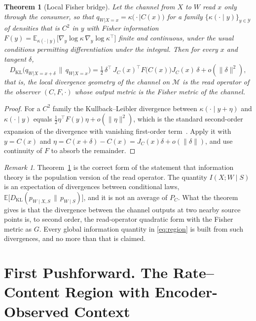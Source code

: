 \documentclass[11pt]{article}
\newtheorem{theorem}{Theorem}
\theoremstyle{definition}
\theoremstyle{remark}
\newtheorem*{remark}{Remark}
\newcommand{\PC}{P_{C}}
\newcommand{\M}{\mathcal{M}}
\newcommand{\Y}{\mathcal{Y}}
\newcommand{\E}{\mathbb{E}}
\begin{document}
\begin{theorem}[Local Fisher bridge]
\label{thm:fisher}
Let the channel from $X$ to $W$ read $x$ only through the consumer, so that $q_{W|X=x}=\kappa\bigl(\cdot\mid C(x)\bigr)$ for a family $\{\kappa(\cdot\mid y)\}_{y\in\Y}$ of densities that is $C^{2}$ in $y$ with Fisher information $F(y)=\E_{\kappa(\cdot\mid y)}\bigl[\nabla_{y}\log\kappa\,\nabla_{y}\log\kappa^{\top}\bigr]$ finite and continuous, under the usual conditions permitting differentiation under the integral. Then for every $x$ and tangent $\delta$,
\begin{equation}
D_{\mathrm{KL}}\bigl(q_{W|X=x+\delta}\,\big\|\,q_{W|X=x}\bigr)=\tfrac12\,\delta^{\top}\,J_{C}(x)^{\top}F\bigl(C(x)\bigr)J_{C}(x)\,\delta+o(\|\delta\|^{2}),
\label{eq:fisher}
\end{equation}
that is, the local divergence geometry of the channel on $\M$ is the read operator of the observer $(C,F,\cdot)$ whose output metric is the Fisher metric of the channel.
\end{theorem}

\begin{proof}
For a $C^{2}$ family the Kullback--Leibler divergence between $\kappa(\cdot\mid y+\eta)$ and $\kappa(\cdot\mid y)$ equals $\tfrac12\eta^{\top}F(y)\eta+o(\|\eta\|^{2})$, which is the standard second-order expansion of the divergence with vanishing first-order term~\cite{amari2016}.
Apply it with $y=C(x)$ and $\eta=C(x+\delta)-C(x)=J_{C}(x)\delta+o(\|\delta\|)$, and use continuity of $F$ to absorb the remainder.
\end{proof}

\begin{remark}
Theorem~\ref{thm:fisher} is the correct form of the statement that information theory is the population version of the read operator.
The quantity $I(X;W\mid S)$ is an expectation of divergences between conditional laws, $\E\bigl[D_{\mathrm{KL}}(p_{W\mid X,S}\,\|\,p_{W\mid S})\bigr]$, and it is not an average of $\PC$.
What the theorem gives is that the divergence between the channel outputs at two nearby source points is, to second order, the read-operator quadratic form with the Fisher metric as $G$.
Every global information quantity in \eqref{eq:region} is built from such divergences, and no more than that is claimed.
\end{remark}

\section{First Pushforward. The Rate--Content Region with Encoder-Observed Context}
\label{sec:coding}
\end{document}
